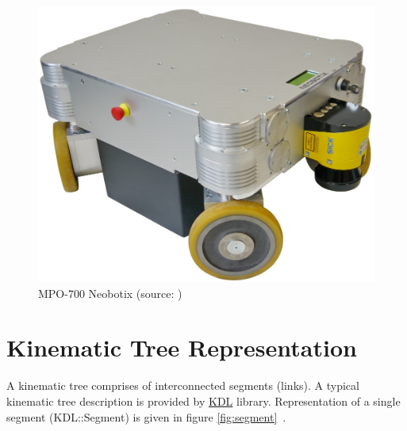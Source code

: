 \begin{figure}[h!]
	\centering	
	\includegraphics[scale=0.5]{images/mp0700}
	\caption{MPO-700 Neobotix (source: \cite{MPO700-Datasheet})}
	\label{fig:MPO-700}
\end{figure}





\section{Kinematic Tree Representation}

A kinematic tree comprises of interconnected segments (links). A typical kinematic tree description is provided by \hyperref[kdl]{KDL} library. Representation of a single segment (KDL::Segment) is given in figure \ref{fig:segment}~\cite{kinematictreeKDL}.


